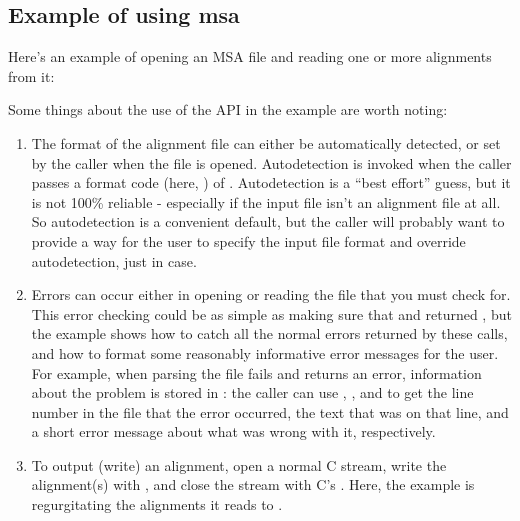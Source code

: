 \subsection{Example of using msa}

Here's an example of opening an MSA file and reading one or more
alignments from it:


Some things about the use of the API in the example are worth noting:

\begin{enumerate}
\item The format of the alignment file can either be automatically
      detected, or set by the caller when the file is opened.
      Autodetection is invoked when the caller passes a format code
      (here, ) of
      . Autodetection is a ``best effort''
      guess, but it is not 100\% reliable - especially if the input
      file isn't an alignment file at all. So autodetection is a
      convenient default, but the caller will probably want to provide
      a way for the user to specify the input file format and override
      autodetection, just in case.

\item Errors can occur either in opening or reading the file that you
      must check for. This error checking could be as simple as making
      sure that  and
       returned , but the example
      shows how to catch all the normal errors returned by these
      calls, and how to format some reasonably informative error
      messages for the user. For example, when parsing the file fails
      and  returns an 
      error, information about the problem is stored in :
      the caller can use , ,
      and  to get the line number in the file that
      the error occurred, the text that was on that line, and a short
      error message about what was wrong with it, respectively.

\item To output (write) an alignment, open a normal C 
      stream, write the alignment(s) with ,
      and close the stream with C's . Here, the
      example is regurgitating the alignments it reads to
      .

\end{enumerate}

